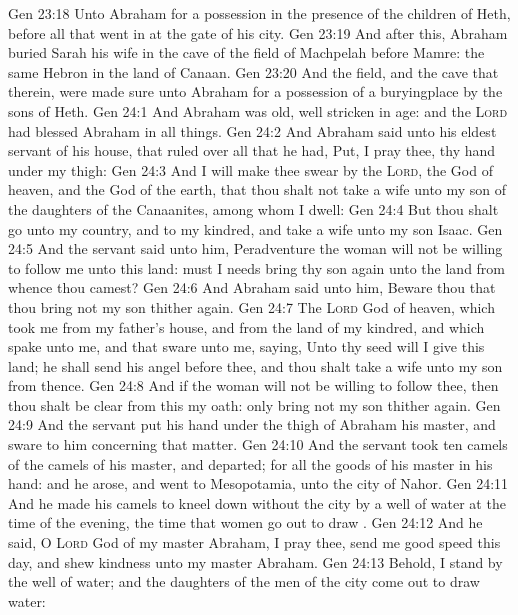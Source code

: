 \vs Gen 23:18 Unto Abraham for a possession in the presence of the children of Heth, before all that went in at the gate of his city.
\vs Gen 23:19 And after this, Abraham buried Sarah his wife in the cave of the field of Machpelah before Mamre: the same  Hebron in the land of Canaan.
\vs Gen 23:20 And the field, and the cave that  therein, were made sure unto Abraham for a possession of a buryingplace by the sons of Heth.
\vs Gen 24:1 And Abraham was old,  well stricken in age: and the \textsc{Lord} had blessed Abraham in all things.
\vs Gen 24:2 And Abraham said unto his eldest servant of his house, that ruled over all that he had, Put, I pray thee, thy hand under my thigh:
\vs Gen 24:3 And I will make thee swear by the \textsc{Lord}, the God of heaven, and the God of the earth, that thou shalt not take a wife unto my son of the daughters of the Canaanites, among whom I dwell:
\vs Gen 24:4 But thou shalt go unto my country, and to my kindred, and take a wife unto my son Isaac.
\vs Gen 24:5 And the servant said unto him, Peradventure the woman will not be willing to follow me unto this land: must I needs bring thy son again unto the land from whence thou camest?
\vs Gen 24:6 And Abraham said unto him, Beware thou that thou bring not my son thither again.
\vs Gen 24:7 The \textsc{Lord} God of heaven, which took me from my father's house, and from the land of my kindred, and which spake unto me, and that sware unto me, saying, Unto thy seed will I give this land; he shall send his angel before thee, and thou shalt take a wife unto my son from thence.
\vs Gen 24:8 And if the woman will not be willing to follow thee, then thou shalt be clear from this my oath: only bring not my son thither again.
\vs Gen 24:9 And the servant put his hand under the thigh of Abraham his master, and sware to him concerning that matter.
\vs Gen 24:10 And the servant took ten camels of the camels of his master, and departed; for all the goods of his master  in his hand: and he arose, and went to Mesopotamia, unto the city of Nahor.
\vs Gen 24:11 And he made his camels to kneel down without the city by a well of water at the time of the evening,  the time that women go out to draw .
\vs Gen 24:12 And he said, O \textsc{Lord} God of my master Abraham, I pray thee, send me good speed this day, and shew kindness unto my master Abraham.
\vs Gen 24:13 Behold, I stand  by the well of water; and the daughters of the men of the city come out to draw water:
